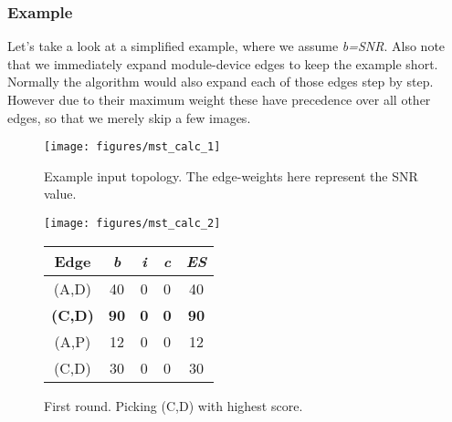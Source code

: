       \subsubsection{Example}
	Let's take a look at a simplified example, where we assume \textit{b=SNR}. Also note that we immediately expand module-device edges to keep the example short.
	Normally the algorithm would also expand each of those edges step by step. However due to their maximum weight these have precedence over all other edges, 
	so that we merely skip a few images.
      \begin{figure}[h!]
	\begin{minipage}{0.5\textwidth}
	  \texttt{[image: figures/mst\_calc\_1]}
	\end{minipage}
	\caption{Example input topology. The edge-weights here represent the SNR value.}
	\label{fig:mst_calc_initial}
      \end{figure}      
      \begin{figure}[h!]
	\centering
	\begin{minipage}{0.4\textwidth}
	  \texttt{[image: figures/mst\_calc\_2]}
	\end{minipage}
	\qquad
	\begin{minipage}{0.49\textwidth}
	  \begin{tabular}{c||c|c|c||c}
	    Edge & \textit{b} & \textit{i} & \textit{c} & \textit{ES}\\ \hline\hline
	    (A,D) & 40 & 0 & 0 & 40 \\ \hline
	    \textbf{(C,D)} & \textbf{90} & \textbf{0} & \textbf{0} & \textbf{90} \\ \hline
	    (A,P) & 12 & 0 & 0 & 12 \\ \hline
	    (C,D) & 30 & 0 & 0 & 30 \\ \hline
	  \end{tabular}
	\end{minipage}
	\caption{First round. Picking (C,D) with highest score.}
	\label{fig:mst_calc_2}
      \end{figure}
